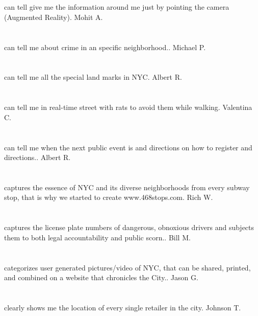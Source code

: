 \section{}can tell give me the information around me just by pointing the camera (Augmented Reality). Mohit A.
\section{}can tell me about crime in an specific neighborhood.. Michael P.
\section{}can tell me all the special land marks in NYC. Albert R.
\section{}can tell me in real-time street with rats to avoid them while walking. Valentina C.
\section{}can tell me when the next public event is and directions on how to register and directions.. Albert R.
\section{}captures the essence of NYC and its diverse neighborhoods from every subway stop,  that is why we started to create  www.468stops.com. Rich W.
\section{}captures the license plate numbers of dangerous,  obnoxious drivers and subjects them to both legal accountability and public scorn.. Bill M.
\section{}categorizes user generated pictures/video of NYC,  that can be shared,  printed,  and combined on a website that chronicles the City.. Jason G.
\section{}clearly shows me the location of every single retailer in the city. Johnson T.
